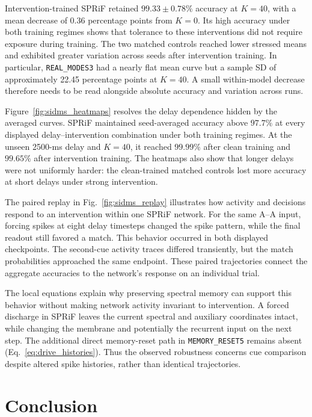 \documentclass[letterpaper,journal]{IEEEtran}
\newcommand{\mr}{\textnormal{\texttt{MEMORY\_RESET5}}}
\newcommand{\rmodes}{\textnormal{\texttt{REAL\_MODES3}}}
\begin{document}
Intervention-trained SPRiF retained $99.33\pm0.78\%$ accuracy at $K=40$, with a mean decrease of 0.36 percentage points from $K=0$. Its high accuracy under both training regimes shows that tolerance to these interventions did not require exposure during training. The two matched controls reached lower stressed means and exhibited greater variation across seeds after intervention training. In particular, \rmodes{} had a nearly flat mean curve but a sample SD of approximately 22.45 percentage points at $K=40$. A small within-model decrease therefore needs to be read alongside absolute accuracy and variation across runs.

Figure~\ref{fig:sidms_heatmaps} resolves the delay dependence hidden by the averaged curves. SPRiF maintained seed-averaged accuracy above $97.7\%$ at every displayed delay--intervention combination under both training regimes. At the unseen 2500-ms delay and $K=40$, it reached $99.99\%$ after clean training and $99.65\%$ after intervention training. The heatmaps also show that longer delays were not uniformly harder: the clean-trained matched controls lost more accuracy at short delays under strong intervention.

The paired replay in Fig.~\ref{fig:sidms_replay} illustrates how activity and decisions respond to an intervention within one SPRiF network. For the same A--A input, forcing spikes at eight delay timesteps changed the spike pattern, while the final readout still favored a match. This behavior occurred in both displayed checkpoints. The second-cue activity traces differed transiently, but the match probabilities approached the same endpoint. These paired trajectories connect the aggregate accuracies to the network's response on an individual trial.

The local equations explain why preserving spectral memory can support this behavior without making network activity invariant to intervention. A forced discharge in SPRiF leaves the current spectral and auxiliary coordinates intact, while changing the membrane and potentially the recurrent input on the next step. The additional direct memory-reset path in \mr{} remains absent (Eq.~\eqref{eq:drive_histories}). Thus the observed robustness concerns cue comparison despite altered spike histories, rather than identical trajectories.

\section{Conclusion}
\label{sec:conclusion}
\end{document}
